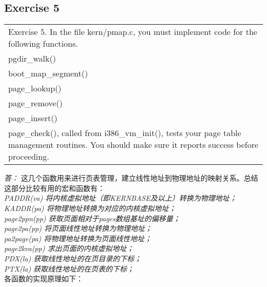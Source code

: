 \documentclass[11pt,a4paper]{article}
\begin{document}
\subsection{Exercise 5}
\begin{tabular}{|p{\textwidth}|}
\hline
Exercise 5.  In the file kern/pmap.c, you must implement code for the following functions.\\
\hspace{2em}pgdir\_walk()\\
\hspace{2em}boot\_map\_segment()\\
\hspace{2em}page\_lookup()\\
\hspace{2em}page\_remove()\\
\hspace{2em}page\_insert()\\
page\_check(), called from i386\_vm\_init(), tests your page table management routines. You should make sure it reports success before proceeding.\\
\hline
\end{tabular}
\textit{\large{答：}}
这几个函数用来进行页表管理，建立线性地址到物理地址的映射关系。总结这部分比较有用的宏和函数有：\\
\textit{
\indent PADDR(va) 将内核虚拟地址（即KERNBASE及以上）转换为物理地址；\\
\indent KADDR(pa) 将物理地址转换为对应的内核虚拟地址；\\
\indent page2ppn(pp) 获取页面相对于pages数组基址的偏移量；\\
\indent page2pa(pp) 将页面线性地址转换为物理地址；\\
\indent pa2page(pa) 将物理地址转换为页面线性地址；\\
\indent page2kva(pp) 求出页面的内核虚拟地址；\\
\indent PDX(la) 获取线性地址的在页目录的下标；\\
\indent PTX(la) 获取线性地址的在页表的下标；}\\ 
各函数的实现原理如下：\\
\end{document}
